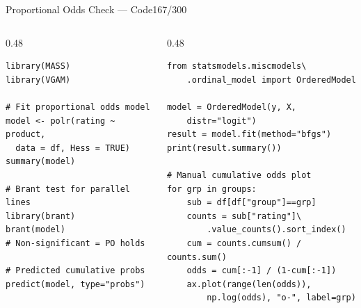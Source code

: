 \documentclass[10pt]{beamer}
\newcommand{\smark}[1]{\hfill{\scriptsize\color{codegray}#1}}
\begin{document}
\begin{frame}[fragile]{Proportional Odds Check --- Code}\smark{167/300}
\begin{columns}[T]
\begin{column}{0.48\textwidth}
\begin{lstlisting}[style=Rstyle]
library(MASS)
library(VGAM)

# Fit proportional odds model
model <- polr(rating ~ product,
  data = df, Hess = TRUE)
summary(model)

# Brant test for parallel lines
library(brant)
brant(model)
# Non-significant = PO holds

# Predicted cumulative probs
predict(model, type="probs")
\end{lstlisting}
\end{column}
\begin{column}{0.48\textwidth}
\begin{lstlisting}[style=Pystyle]
from statsmodels.miscmodels\
    .ordinal_model import OrderedModel

model = OrderedModel(y, X,
    distr="logit")
result = model.fit(method="bfgs")
print(result.summary())

# Manual cumulative odds plot
for grp in groups:
    sub = df[df["group"]==grp]
    counts = sub["rating"]\
        .value_counts().sort_index()
    cum = counts.cumsum() / counts.sum()
    odds = cum[:-1] / (1-cum[:-1])
    ax.plot(range(len(odds)),
        np.log(odds), "o-", label=grp)
\end{lstlisting}
\end{column}
\end{columns}
\end{frame}
\end{document}
